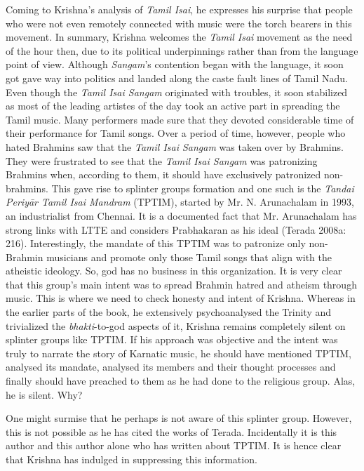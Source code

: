 {Coming to Krishna’s analysis of \textit{Tamil Isai}, he expresses his surprise that people who were not even remotely connected with music were the torch bearers in this movement. In summary, Krishna welcomes the \textit{Tamil Isai} movement as the need of the hour then, due to its political underpinnings rather than from the language point of view. Although \textit{Sangam}’s contention began with the language, it soon got gave way into politics and landed along the caste fault lines of Tamil Nadu. Even though the \textit{Tamil Isai Sangam} originated with troubles, it soon stabilized as most of the leading artistes of the day took an active part in spreading the Tamil music. Many performers made sure that they devoted considerable time of their performance for Tamil songs. Over a period of time, however, people who hated Brahmins saw that the \textit{Tamil Isai Sangam} was taken over by Brahmins. They were frustrated to see that the \textit{Tamil Isai Sangam} was patronizing Brahmins when, according to them, it should have exclusively patronized non-brahmins. This gave rise to splinter groups formation and one such is the \textit{Tandai Periyār Tamil Isai Mandram} (TPTIM), started by Mr. N. Arunachalam in 1993, an industrialist from Chennai. It is a documented fact that Mr. Arunachalam has strong links with LTTE and considers Prabhakaran as his ideal (Terada 2008a: 216). Interestingly, the mandate of this TPTIM was to patronize only non-Brahmin musicians and promote only those Tamil songs that align with the atheistic ideology. So, god has no business in this organization. It is very clear that this group’s main intent was to spread Brahmin hatred and atheism through music. This is where we need to check honesty and intent of Krishna. Whereas in the earlier parts of the book, he extensively psychoanalysed the Trinity and trivialized the \textit{bhakti}-to-god aspects of it, Krishna remains completely silent on splinter groups like TPTIM. If his approach was objective and the intent was truly to narrate the story of Karnatic music, he should have mentioned TPTIM, analysed its mandate, analysed its members and their thought processes and finally should have preached to them as he had done to the religious group. Alas, he is silent. Why?

One might surmise that he perhaps is not aware of this splinter group. However, this is not possible as he has cited the works of Terada. Incidentally it is this author and this author alone who has written about TPTIM. It is hence clear that Krishna has indulged in suppressing this information.

}

